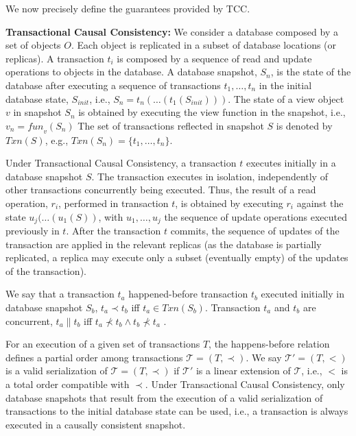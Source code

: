 \documentclass[sigconf, nonacm]{acmart}
\begin{document}
We now precisely define the guarantees provided by TCC.

\noindent
\textbf{Transactional Causal Consistency:}
We consider a database composed by a set of objects $O$. Each object is replicated in a subset of 
database locations (or replicas).
A transaction $t_i$ is composed by a sequence of read and update operations to objects in the database.
A database snapshot, $S_n$, is the state of the database after executing a sequence of 
transactions $t_1,\ldots,t_n$ in the initial database state, $S_{init}$, i.e., $S_n =
t_n(\ldots(t_1(S_{init})))$.  The state of a view object $v$ in snapshot $S_n$ is obtained by executing
the view function in the snapshot, i.e.,  $v_n = \mathit{fun}_v(S_n)$
The set of transactions reflected in snapshot $S$ is denoted by $Txn(S)$,
e.g., $Txn(S_n) = \{t_1,\ldots,t_n\}$.

Under Transactional Causal Consistency, a transaction $t$  executes initially in a database snapshot $S$.
The transaction executes in isolation, independently of other transactions concurrently being executed. 
Thus, the result of a read operation, $r_i$, performed in transaction $t$, is obtained by executing $r_i$
against the state $u_j(\ldots(u_1(S))$, with $u_1,\ldots,u_j$ the sequence of update operations executed 
previously in $t$. After the transaction $t$ commits, the sequence of updates of the transaction are applied
in the relevant replicas (as the database is partially replicated, a replica may execute only a subset (eventually empty) 
of the updates of the transaction).

We say that a transaction $t_a$
happened-before transaction $t_b$ executed initially in  database snapshot $S_b$,
$t_a \! \prec \! t_b$ iff \mbox{$t_a \!\in \! Txn(S_b)$}.
Transaction $t_a$ and $t_b$ are concurrent, $t_a \parallel  t_b$ iff
$t_a \! \not \prec \! t_b  \wedge  t_b \! \not \prec \! t_a$ \cite{lamport78}.

For an execution of a given set of transactions $T$, the happens-before relation defines
a partial order among transactions \mbox{$\mathcal{T} = (T,\prec)$}.
We say $\mathcal{T'} = (T,<)$ is a valid serialization of $\mathcal{T} = (T,\prec)$
if $\mathcal{T'}$ is a linear extension of $\mathcal{T}$, i.e., $<$ is a total order
compatible with $\prec$.
Under Transactional Causal Consistency, only database snapshots that result from the 
execution of a valid serialization of transactions to the initial database state can be used, i.e.,
a transaction is always executed in a causally consistent snapshot.
\end{document}
